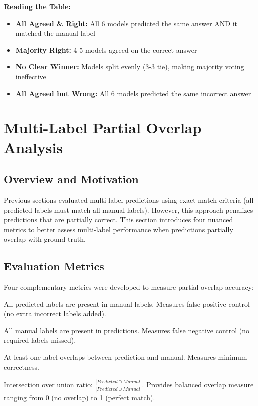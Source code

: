 \documentclass[12pt,a4paper]{article}
\begin{document}
\textbf{Reading the Table:}
\begin{itemize}[leftmargin=*]
    \item \textbf{All Agreed \& Right:} All 6 models predicted the same answer AND it matched the manual label
    \item \textbf{Majority Right:} 4-5 models agreed on the correct answer
    \item \textbf{No Clear Winner:} Models split evenly (3-3 tie), making majority voting ineffective
    \item \textbf{All Agreed but Wrong:} All 6 models predicted the same incorrect answer
\end{itemize}

\newpage

\section{Multi-Label Partial Overlap Analysis}

\subsection{Overview and Motivation}

Previous sections evaluated multi-label predictions using exact match criteria (all predicted labels must match all manual labels). However, this approach penalizes predictions that are partially correct. This section introduces four nuanced metrics to better assess multi-label performance when predictions partially overlap with ground truth.

\subsection{Evaluation Metrics}

Four complementary metrics were developed to measure partial overlap accuracy:

\begin{description}[leftmargin=*]
    \item[Case A: Precision-Based] All predicted labels are present in manual labels. Measures false positive control (no extra incorrect labels added).
    
    \item[Case B: Recall-Based] All manual labels are present in predictions. Measures false negative control (no required labels missed).
    
    \item[Case C: Any Overlap] At least one label overlaps between prediction and manual. Measures minimum correctness.
    
    \item[Case D: Jaccard Score] Intersection over union ratio: $\frac{|Predicted \cap Manual|}{|Predicted \cup Manual|}$. Provides balanced overlap measure ranging from 0 (no overlap) to 1 (perfect match).
\end{description}
\end{document}
